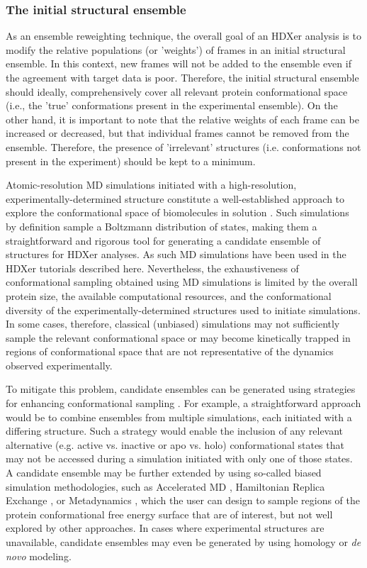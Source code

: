 \documentclass[9pt,tutorial,ASAPversion]{livecoms}
\begin{document}
\subsubsection{The initial structural ensemble}\label{initialensemble_sect}
As an ensemble reweighting technique, the overall goal of an HDXer analysis is to modify the relative populations (or 'weights') of frames in an initial structural ensemble.
In this context, new frames will not be added to the ensemble even if the agreement with target data is poor. 
Therefore, the initial structural ensemble should ideally, comprehensively cover all relevant protein conformational space (i.e., the 'true' conformations present in the experimental ensemble).
On the other hand, it is important to note that the relative weights of each frame can be increased or decreased, but that individual frames cannot be removed from the ensemble. 
Therefore, the presence of 'irrelevant' structures (i.e. conformations not present in the experiment) should be kept to a minimum.

Atomic-resolution MD simulations initiated with a high-resolution, experimentally-determined structure constitute a well-established approach to explore the conformational space of biomolecules in solution \cite{Huggins2019}. 
Such simulations by definition sample a Boltzmann distribution of states, making them a straightforward and rigorous tool for generating a candidate ensemble of structures for HDXer analyses.
As such MD simulations have been used in the HDXer tutorials described here.
Nevertheless, the exhaustiveness of conformational sampling obtained using MD simulations is limited by the overall protein size, the available computational resources, and the conformational diversity of the experimentally-determined structures used to initiate simulations.
In some cases, therefore, classical (unbiased) simulations may not sufficiently sample the relevant conformational space or may become kinetically trapped in regions of conformational space that are not representative of the dynamics observed experimentally.

To mitigate this problem, candidate ensembles can be generated using strategies for enhancing conformational sampling \cite{Allison2020}.
For example, a straightforward approach would be to combine ensembles from multiple simulations, each initiated with a differing structure.
Such a strategy would enable the inclusion of any relevant alternative (e.g. active vs. inactive or apo vs. holo) conformational states that may not be accessed during a simulation initiated with only one of those states.
A candidate ensemble may be further extended by using so-called biased simulation methodologies, such as Accelerated MD \cite{Hamelberg2004}, Hamiltonian Replica Exchange \cite{Fukunishi2002}, or Metadynamics \cite{Laio2002}, which the user can design to sample regions of the protein conformational free energy surface that are of interest, but not well explored by other approaches.
In cases where experimental structures are unavailable, candidate ensembles may even be generated by using homology or \textit{de novo} modeling.
\end{document}
